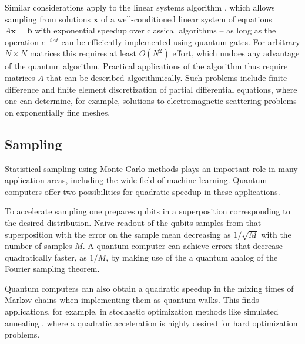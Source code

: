 \documentclass[journal]{IEEEtran}
\begin{document}
Similar considerations apply to the linear systems algorithm \cite{HHL}, which allows  sampling from solutions $\mathbf{x}$ of a well-conditioned  linear system of equations $A\mathbf{x}=\mathbf{b}$ with exponential speedup over classical algorithms -- as long as the operation $e^{-iAt}$ can be efficiently implemented using quantum gates. For arbitrary $N\times N$ matrices this requires at least $O(N^2)$ effort, which undoes any advantage of the quantum algorithm. %
Practical applications of the algorithm thus require matrices $A$ that can be described algorithmically. %
Such problems include  finite difference and finite element discretization of partial differential equations, where one can determine, for example, solutions to electromagnetic scattering problems on exponentially fine meshes. 

\subsection{Sampling}

Statistical sampling using Monte Carlo methods plays an important role in many application areas, including the wide field of machine learning. Quantum computers offer two possibilities for quadratic speedup in these applications. 

To accelerate sampling one prepares qubits in a superposition corresponding to the desired distribution. Naive readout of the qubits  samples from that superposition with the error on the sample mean decreasing as $1/\sqrt{M}$ with the number of samples $M$. %
A quantum computer can achieve errors that decrease quadratically faster, as $1/M$, by making use of the a quantum analog of the Fourier sampling theorem.

Quantum computers can also obtain a quadratic speedup in the mixing times of Markov chains when implementing them as quantum walks. This finds applications, for example, in stochastic optimization methods like simulated annealing \cite{qsa}, where  a quadratic acceleration is highly desired for hard optimization problems. 
\end{document}
